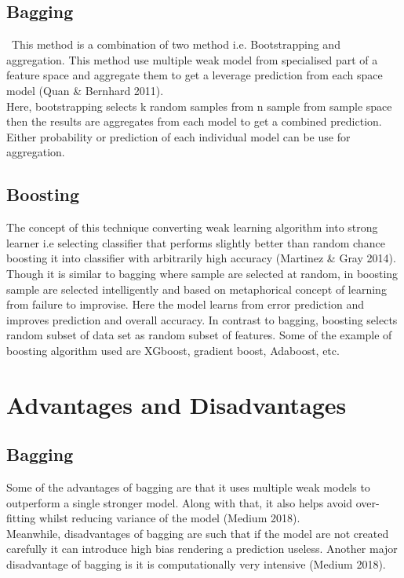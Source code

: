 \documentclass{article}
\begin{document}
\subsection{Bagging}\
This method is a combination of two method i.e. Bootstrapping and aggregation. This method use multiple weak model from specialised part of a feature space and aggregate them to get a leverage prediction from each space model (Quan & Bernhard 2011).\\

Here, bootstrapping selects k random samples from n sample from sample space then the results are aggregates from each model to get a combined prediction. Either probability or prediction of each individual model can be use for aggregation.

\subsection{Boosting}\label{SEC:Methods }
The concept of this technique converting weak learning algorithm into strong learner i.e selecting classifier that performs slightly better than random chance boosting it into classifier with arbitrarily high accuracy (Martinez & Gray 2014). Though it is similar to bagging where sample are selected at random, in boosting sample are selected intelligently and based on metaphorical concept of learning from failure to improvise. Here the model learns from error prediction and improves prediction and overall accuracy. In contrast to bagging, boosting selects random subset of data set as random subset of features. Some of the example of boosting algorithm used are XGboost, gradient boost, Adaboost, etc.
    

\section{Advantages and Disadvantages}
\subsection{Bagging}\label{sec:Bagging}
Some of the advantages of bagging are that it uses multiple weak models to outperform a single stronger model. Along with that, it also helps avoid over-fitting whilst reducing variance of the model (Medium 2018).\\

Meanwhile, disadvantages of bagging are such that if the model are not created carefully it can introduce high bias rendering a prediction useless. Another major disadvantage of bagging is it is computationally very intensive (Medium 2018).
\end{document}
